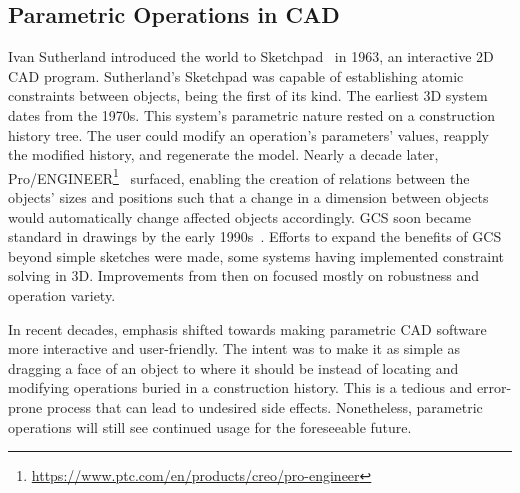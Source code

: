 \subsection{Parametric Operations in CAD}%
\label{sec:intro.parametric}

Ivan Sutherland introduced the world to
Sketchpad~\cite{Sutherland:1964:Sketchpad} in 1963, an interactive 2D \ac{CAD}
program.  Sutherland's Sketchpad was capable of establishing atomic constraints
between objects, being the first of its kind.  The earliest 3D
system~\cite{Requicha:1980:RRS:356827.356833} dates from the 1970s.  This
system's parametric nature rested on a construction history tree.  The user
could modify an operation's parameters' values, reapply the modified history,
and regenerate the model.  Nearly a decade later,
Pro/ENGINEER\footnote{\url{https://www.ptc.com/en/products/creo/pro-engineer}}~\cite{Jabi:2013:PDA}
surfaced, enabling the creation of relations between the objects' sizes and
positions such that a change in a dimension between objects would automatically
change affected objects accordingly.  \Ac{GCS} soon became standard in drawings
by the early 1990s~\cite{Owen:1991:ASGDC,Bouma:1995:GCS}.  Efforts to expand the
benefits of \ac{GCS} beyond simple sketches were made, some systems having
implemented constraint solving in 3D.  Improvements from then on focused mostly
on robustness and operation variety.

In recent decades, emphasis shifted towards making parametric \ac{CAD} software
more interactive and user-friendly.  The intent was to make it as simple as
dragging a face of an object to where it should be instead of locating and
modifying operations buried in a construction history.  This is a tedious and
error-prone process that can lead to undesired side effects.  Nonetheless,
parametric operations will still see continued usage for the foreseeable future.

